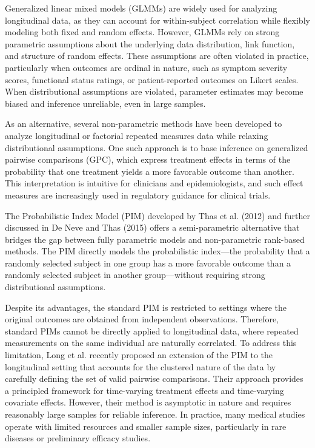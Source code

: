\documentclass[alpha-refs]{wiley-article}
\begin{document}
Generalized linear mixed models (GLMMs) are widely used for analyzing longitudinal data, as they can account for within-subject correlation while flexibly modeling both fixed and random effects. However, GLMMs rely on strong parametric assumptions about the underlying data distribution, link function, and structure of random effects. These assumptions are often violated in practice, particularly when outcomes are ordinal in nature, such as symptom severity scores, functional status ratings, or patient-reported outcomes on Likert scales. When distributional assumptions are violated, parameter estimates may become biased and inference unreliable, even in large samples.

As an alternative, several non-parametric methods have been developed to analyze longitudinal or factorial repeated measures data while relaxing distributional assumptions. One such approach is to base inference on generalized pairwise comparisons (GPC), which express treatment effects in terms of the probability that one treatment yields a more favorable outcome than another. This interpretation is intuitive for clinicians and epidemiologists, and such effect measures are increasingly used in regulatory guidance for clinical trials.

The Probabilistic Index Model (PIM) developed by Thas et al. (2012) and further discussed in De Neve and Thas (2015) offers a semi-parametric alternative that bridges the gap between fully parametric models and non-parametric rank-based methods. The PIM directly models the probabilistic index---the probability that a randomly selected subject in one group has a more favorable outcome than a randomly selected subject in another group---without requiring strong distributional assumptions.

Despite its advantages, the standard PIM is restricted to settings where the original outcomes are obtained from independent observations. Therefore, standard PIMs cannot be directly applied to longitudinal data, where repeated measurements on the same individual are naturally correlated. To address this limitation, Long et al. recently proposed an extension of the PIM to the longitudinal setting that accounts for the clustered nature of the data by carefully defining the set of valid pairwise comparisons. Their approach provides a principled framework for time-varying treatment effects and time-varying covariate effects. However, their method is asymptotic in nature and requires reasonably large samples for reliable inference. In practice, many medical studies operate with limited resources and smaller sample sizes, particularly in rare diseases or preliminary efficacy studies.
\end{document}

